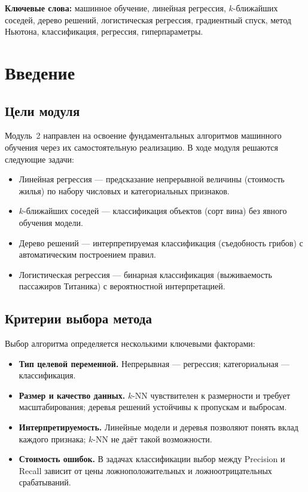 \documentclass[12pt,a4paper]{article}
\begin{document}
\medskip
\noindent\textbf{Ключевые слова:} машинное обучение, линейная регрессия,
\(k\)-ближайших соседей, дерево решений, логистическая регрессия,
градиентный спуск, метод Ньютона, классификация, регрессия,
гиперпараметры.

\newpage

\section{Введение}

\subsection{Цели модуля}

Модуль~2 направлен на освоение фундаментальных алгоритмов машинного
обучения через их самостоятельную реализацию. В ходе модуля решаются
следующие задачи:

\begin{itemize}
    \item Линейная регрессия — предсказание непрерывной величины
          (стоимость жилья) по набору числовых и категориальных
          признаков.
    \item \(k\)-ближайших соседей — классификация объектов (сорт вина)
          без явного обучения модели.
    \item Дерево решений — интерпретируемая классификация (съедобность
          грибов) с автоматическим построением правил.
    \item Логистическая регрессия — бинарная классификация (выживаемость
          пассажиров Титаника) с вероятностной интерпретацией.
\end{itemize}

\subsection{Критерии выбора метода}

Выбор алгоритма определяется несколькими ключевыми факторами:

\begin{itemize}
    \item \textbf{Тип целевой переменной.} Непрерывная — регрессия;
          категориальная — классификация.
    \item \textbf{Размер и качество данных.} \(k\)-NN чувствителен
          к размерности и требует масштабирования; деревья решений
          устойчивы к пропускам и выбросам.
    \item \textbf{Интерпретируемость.} Линейные модели и деревья
          позволяют понять вклад каждого признака; \(k\)-NN не даёт
          такой возможности.
    \item \textbf{Стоимость ошибок.} В задачах классификации выбор
          между Precision и Recall зависит от цены ложноположительных
          и ложноотрицательных срабатываний.
\end{itemize}
\end{document}
